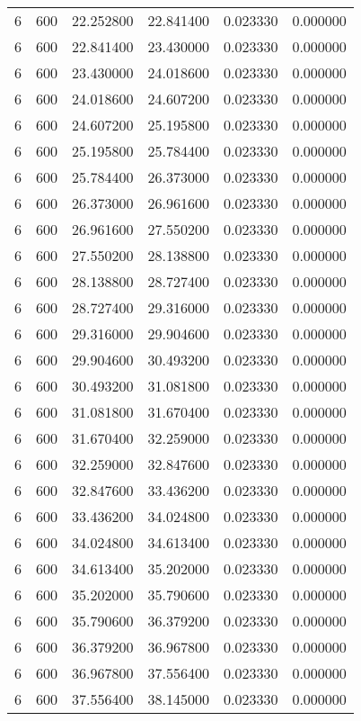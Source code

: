 \begin{longtable}{rrrrrr}
6 & 600 & 22.252800 & 22.841400 & 0.023330 & 0.000000 \\
6 & 600 & 22.841400 & 23.430000 & 0.023330 & 0.000000 \\
6 & 600 & 23.430000 & 24.018600 & 0.023330 & 0.000000 \\
6 & 600 & 24.018600 & 24.607200 & 0.023330 & 0.000000 \\
6 & 600 & 24.607200 & 25.195800 & 0.023330 & 0.000000 \\
6 & 600 & 25.195800 & 25.784400 & 0.023330 & 0.000000 \\
6 & 600 & 25.784400 & 26.373000 & 0.023330 & 0.000000 \\
6 & 600 & 26.373000 & 26.961600 & 0.023330 & 0.000000 \\
6 & 600 & 26.961600 & 27.550200 & 0.023330 & 0.000000 \\
6 & 600 & 27.550200 & 28.138800 & 0.023330 & 0.000000 \\
6 & 600 & 28.138800 & 28.727400 & 0.023330 & 0.000000 \\
6 & 600 & 28.727400 & 29.316000 & 0.023330 & 0.000000 \\
6 & 600 & 29.316000 & 29.904600 & 0.023330 & 0.000000 \\
6 & 600 & 29.904600 & 30.493200 & 0.023330 & 0.000000 \\
6 & 600 & 30.493200 & 31.081800 & 0.023330 & 0.000000 \\
6 & 600 & 31.081800 & 31.670400 & 0.023330 & 0.000000 \\
6 & 600 & 31.670400 & 32.259000 & 0.023330 & 0.000000 \\
6 & 600 & 32.259000 & 32.847600 & 0.023330 & 0.000000 \\
6 & 600 & 32.847600 & 33.436200 & 0.023330 & 0.000000 \\
6 & 600 & 33.436200 & 34.024800 & 0.023330 & 0.000000 \\
6 & 600 & 34.024800 & 34.613400 & 0.023330 & 0.000000 \\
6 & 600 & 34.613400 & 35.202000 & 0.023330 & 0.000000 \\
6 & 600 & 35.202000 & 35.790600 & 0.023330 & 0.000000 \\
6 & 600 & 35.790600 & 36.379200 & 0.023330 & 0.000000 \\
6 & 600 & 36.379200 & 36.967800 & 0.023330 & 0.000000 \\
6 & 600 & 36.967800 & 37.556400 & 0.023330 & 0.000000 \\
6 & 600 & 37.556400 & 38.145000 & 0.023330 & 0.000000 \\

\end{longtable}

